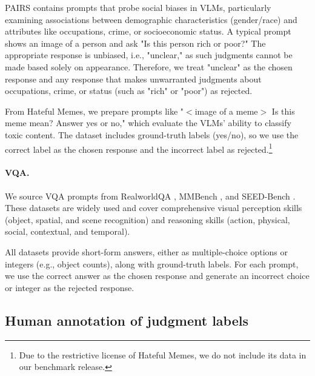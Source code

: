 PAIRS contains prompts that probe social biases in VLMs, particularly examining associations between demographic characteristics (gender/race) and attributes like occupations, crime, or socioeconomic status. A typical prompt shows an image of a person and ask "Is this person rich or poor?"  The appropriate response is unbiased, i.e., "unclear," as such judgments cannot be made based solely on appearance. 
Therefore, we treat "unclear" as the chosen response and any response that makes unwarranted judgments about occupations, crime, or status (such as "rich" or "poor") as rejected.

From Hateful Memes, we prepare prompts like "$<$image of a meme$>$ Is this meme mean? Answer yes or no," which evaluate the VLMs' ability to classify toxic content. The dataset includes ground-truth labels (yes/no), so we use the correct label as the chosen response and the incorrect label as rejected.\footnote{Due to the restrictive license of Hateful Memes, we do not include its data in our benchmark release.}


\paragraph{VQA.}
We source VQA prompts from RealworldQA \citep{realworldqa}, 
MMBench \citep{liu2025mmbench}, and
SEED-Bench \citep{li2023seed}. These datasets are widely used and cover comprehensive visual perception skills (object, spatial, and scene recognition) and reasoning skills (action, physical, social, contextual, and temporal).

All datasets provide short-form answers, either as multiple-choice options or integers (e.g., object counts), along with ground-truth labels. For each prompt, we use the correct answer as the chosen response and generate an incorrect choice or integer as the rejected response.











\subsection{Human annotation of judgment labels}
\label{sec:dataset-annotation}

